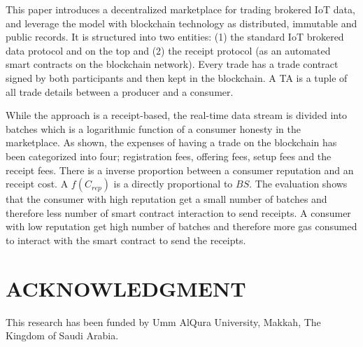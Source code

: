 \documentclass[letterpaper, 10 pt, conference]{ieeeconf}  %
\begin{document}
This paper introduces a decentralized marketplace for trading brokered IoT data, and leverage the model with blockchain technology as distributed, immutable and public records. It is structured into two entities: (1) the standard IoT brokered data protocol and on the top and (2) the receipt protocol (as an automated smart contracts on the blockchain network). Every trade has a trade contract signed by both participants and then kept in the blockchain. A TA is a tuple of all trade details between a producer and a consumer.

While the approach is a receipt-based, the real-time data stream is divided into batches which is a logarithmic function of a consumer honesty in the marketplace. As shown, the expenses of having a trade on the blockchain has been categorized into four; registration fees, offering fees, setup fees and the receipt fees. 
There is a inverse proportion between a consumer reputation and an receipt cost. A $f(C_{rep})$ is a directly proportional to $BS$. The evaluation shows that the consumer with high reputation get a small number of batches and therefore less number of smart contract interaction to send receipts. A consumer with low reputation get high number of batches and therefore more gas consumed to interact with the smart contract to send the receipts. 










\section*{ACKNOWLEDGMENT}

This research has been funded by Umm AlQura University, Makkah, The Kingdom of Saudi Arabia.





\end{document}
